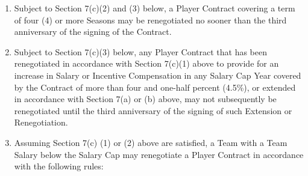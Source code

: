\documentclass[
]{book}
\providecommand{\tightlist}{%
  \setlength{\itemsep}{0pt}\setlength{\parskip}{0pt}}
\begin{document}
\begin{enumerate}
  \begin{enumerate}
  \def\labelenumii{(\arabic{enumii})}
  \tightlist
  \item
    Subject to Section 7(c)(2) and (3) below, a Player Contract covering a term of four (4) or more Seasons may be renegotiated no sooner than the third anniversary of the signing of the Contract.
  \item
    Subject to Section 7(c)(3) below, any Player Contract that has been renegotiated in accordance with Section 7(c)(1) above to provide for an increase in Salary or Incentive Compensation in any Salary Cap Year covered by the Contract of more than four and one-half percent (4.5\%), or extended in accordance with Section 7(a) or (b) above, may not subsequently be renegotiated until the third anniversary of the signing of such Extension or Renegotiation.
  \item
    Assuming Section 7(c) (1) or (2) above are satisfied, a Team with a Team Salary below the Salary Cap may renegotiate a Player Contract in accordance with the following rules:


\end{enumerate}
\end{enumerate}
\end{document}
